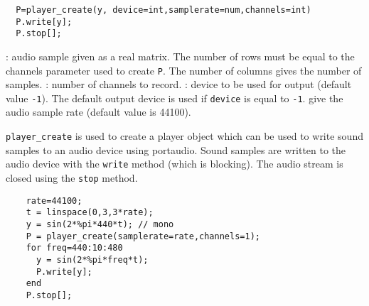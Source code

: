 
\begin{mandesc}
\end{mandesc}
\begin{calling_sequence}
\begin{verbatim}
  P=player_create(y, device=int,samplerate=num,channels=int)  
  P.write[y];
  P.stop[];
\end{verbatim}
\end{calling_sequence}
\begin{parameters}
  \begin{varlist}
    : audio sample given as a real matrix. The number of 
    rows must be equal to the channels parameter used to create \verb+P+.
    The number of columns gives the number of samples.
   : number of channels to record.
   : device to be used for output (default value \verb+-1+). The default output 
   device is used if \verb+device+ is equal to \verb+-1+.
    give the audio sample rate (default value is 44100).
  \end{varlist}
\end{parameters}

\begin{mandescription}
  \verb+player_create+ is used to create a player object which can be used to 
  write sound samples to an audio device using portaudio. 
  Sound samples are written to the audio device with the \verb+write+ method 
  (which is blocking). The audio stream is closed using the \verb+stop+ method. 
\end{mandescription}
\begin{examples}
  \begin{Verbatim}
    rate=44100;
    t = linspace(0,3,3*rate);
    y = sin(2*%pi*440*t); // mono 
    P = player_create(samplerate=rate,channels=1);
    for freq=440:10:480
      y = sin(2*%pi*freq*t);
      P.write[y]; 
    end
    P.stop[];
  \end{Verbatim}
\end{examples}
\begin{manseealso}
\end{manseealso}

